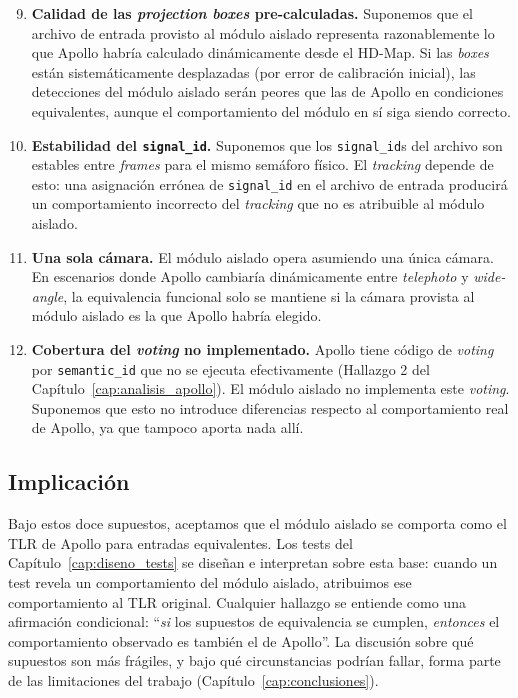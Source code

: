 \begin{enumerate}
    \setcounter{enumi}{8}
    \item \textbf{Calidad de las \textit{projection boxes} pre-calculadas.} Suponemos que el archivo de entrada provisto al módulo aislado representa razonablemente lo que Apollo habría calculado dinámicamente desde el HD-Map. Si las \textit{boxes} están sistemáticamente desplazadas (por error de calibración inicial), las detecciones del módulo aislado serán peores que las de Apollo en condiciones equivalentes, aunque el comportamiento del módulo en sí siga siendo correcto.

    \item \textbf{Estabilidad del \texttt{signal\_id}.} Suponemos que los \texttt{signal\_id}s del archivo son estables entre \textit{frames} para el mismo semáforo físico. El \textit{tracking} depende de esto: una asignación errónea de \texttt{signal\_id} en el archivo de entrada producirá un comportamiento incorrecto del \textit{tracking} que no es atribuible al módulo aislado.

    \item \textbf{Una sola cámara.} El módulo aislado opera asumiendo una única cámara. En escenarios donde Apollo cambiaría dinámicamente entre \textit{telephoto} y \textit{wide-angle}, la equivalencia funcional solo se mantiene si la cámara provista al módulo aislado es la que Apollo habría elegido.

    \item \textbf{Cobertura del \textit{voting} no implementado.} Apollo tiene código de \textit{voting} por \texttt{semantic\_id} que no se ejecuta efectivamente (Hallazgo 2 del Capítulo~\ref{cap:analisis_apollo}). El módulo aislado no implementa este \textit{voting}. Suponemos que esto no introduce diferencias respecto al comportamiento real de Apollo, ya que tampoco aporta nada allí.
\end{enumerate}

\subsection{Implicación}

Bajo estos doce supuestos, aceptamos que el módulo aislado se comporta como el TLR de Apollo para entradas equivalentes. Los tests del Capítulo~\ref{cap:diseno_tests} se diseñan e interpretan sobre esta base: cuando un test revela un comportamiento del módulo aislado, atribuimos ese comportamiento al TLR original. Cualquier hallazgo se entiende como una afirmación condicional: ``\textit{si} los supuestos de equivalencia se cumplen, \textit{entonces} el comportamiento observado es también el de Apollo''. La discusión sobre qué supuestos son más frágiles, y bajo qué circunstancias podrían fallar, forma parte de las limitaciones del trabajo (Capítulo~\ref{cap:conclusiones}).

